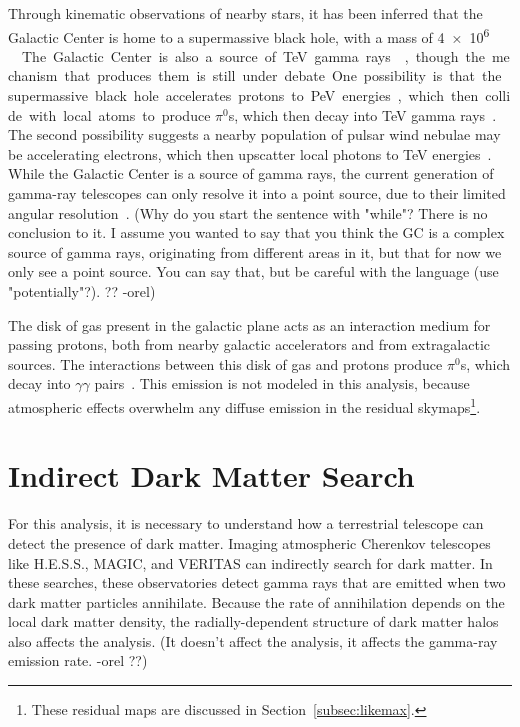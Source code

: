   Through kinematic observations of nearby stars, it has been inferred that the Galactic Center is home to a supermassive black hole, with a mass of \SI{4e6}{ \Msol{} }~\cite{sgra_massdist}.
  The Galactic Center is also a source of TeV gamma rays~\cite{gc_pointsrc_hess,gc_pointsource_hess2,gc_veritas_pointsource,gc_magic_pointsource}, though the mechanism that produces them is still under debate.
  One possibility is that the supermassive black hole accelerates protons to PeV energies, which then collide with local atoms to produce $\pi^0$s, which then decay into TeV gamma rays~\cite{gc_pevatron}.
  The second possibility suggests a nearby population of pulsar wind nebulae may be accelerating electrons, which then upscatter local photons to TeV energies~\cite{gc_pulsars}.
  While the Galactic Center is a source of gamma rays, the current generation of gamma-ray telescopes can only resolve it into a point source, due to their limited angular resolution~\cite{VeritasGCRidge2015,gc_pointsrc_hess}.
  {\color{red}(Why do you start the sentence with "while"? There is no conclusion to it. I assume you wanted to say that you think the GC is a complex source of gamma rays, originating from different areas in it, but that for now we only see a point source. You can say that, but be careful with the language (use "potentially"?). ?? -orel)}

  The disk of gas present in the galactic plane acts as an interaction medium for passing protons, both from nearby galactic accelerators and from extragalactic sources.
  The interactions between this disk of gas and protons produce $\pi^0$s, which decay into $\gamma\gamma$ pairs~\cite{hess_gc_diffuse}.
  This emission is not modeled in this analysis, because atmospheric effects overwhelm any diffuse emission in the residual skymaps\footnote{These residual maps are discussed in Section~\ref{subsec:likemax}.}.


\section{Indirect Dark Matter Search}
  For this analysis, it is necessary to understand how a terrestrial telescope can detect the presence of dark matter.
  Imaging atmospheric Cherenkov telescopes like H.E.S.S., MAGIC, and VERITAS can indirectly search for dark matter.
  In these searches, these observatories detect gamma rays that are emitted when two dark matter particles annihilate.
  Because the rate of annihilation depends on the local dark matter density, the radially-dependent structure of dark matter halos also affects the analysis.
  {\color{red}(It doesn't affect the analysis, it affects the gamma-ray emission rate. -orel ??)}

